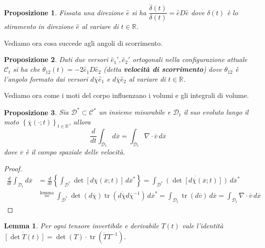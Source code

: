 \documentclass{book}
\theoremstyle{plain}
\theoremstyle{plain}
\newtheorem*{lemma}{Lemma}
\theoremstyle{plain}
\theoremstyle{plain}
\theoremstyle{plain}
\newtheorem{prop}{Proposizione}[chapter]
\theoremstyle{definition}
\theoremstyle{remark}
\theoremstyle{definition}
\begin{document}
\begin{prop}
    Fissata una direzione $\hat{e}$ si ha $\dfrac{\dot{\delta}(t)}{\delta(t)}=\hat{e}D\hat{e}$ dove ${\delta}(t)$ è lo stiramento in direzione $\hat{e}$ al variare di $t\in\mathbb{R}$.
\end{prop}

\noindent Vediamo ora cosa succede agli angoli di scorrimento.

\begin{prop}
    Dati due versori $\hat{e}_1', \hat{e}_2'$ ortogonali nella configurazione attuale $\mathcal{C}_t$ si ha che $\dot{\theta}_{12}(t)=-2\hat{e}_1D\hat{e}_2$ (detta \textbf{velocità di scorrimento}) dove $\theta_{12}$ è l'angolo formato dai versori $d\overline{\chi}\hat{e}_1$ e $d\overline{\chi}\hat{e}_2$ al variare di $t\in\mathbb{R}$.
\end{prop}

\noindent Vediamo ora come i moti del corpo influenzano i volumi e gli integrali di volume.

\begin{prop}
    Sia $\mathcal{D}^* \subset\mathcal{C}^*$ un insieme misurabile e $\mathcal{D}_t$ il suo evoluto lungo il moto $\left\{\overline{\chi}(\cdot;t)\right\}_{t \in \mathbb{R}}$, allora
    \begin{displaymath}
        \frac{d}{dt}\int_{\mathcal{D}_t}d\overline{x}=\int_{\mathcal{D}_t}\nabla\cdot\overline{v}\,d\overline{x}
    \end{displaymath}
    dove $\overline{v}$ è il campo spaziale delle velocità.
\end{prop}

\begin{proof}
    \[
    \begin{split}
        \frac{d}{dt}\int_{\mathcal{D}_t}d\overline{x}&=\frac{d}{dt}\left\{\int_{\mathcal{D}^*}\det [d\overline{\chi}(\overline{x};t)]\,d\overline{x}^*\right\}=\int_{\mathcal{D}^*}\Dot{\left(\det [d\overline{\chi}(\overline{x};t)]\right)}\,d\overline{x}^* \\
        &\overset{\text{lemma}}{=}\int_{\mathcal{D}^*}\det(d\overline{\chi})\operatorname{tr}(d\Dot{\overline{\chi}}d\overline{\chi}^{-1})\,d\overline{x}^*=\int_{\mathcal{D}_t}\operatorname{tr}(d\overline{v})\,d\overline{x}=\int_{\mathcal{D}_t}\nabla\cdot\overline{v}\,d\overline{x}
    \end{split}
    \]
\end{proof}

\begin{lemma}
    Per ogni  tensore invertibile e derivabile $T(t)$ vale l'identità $\dot{[\det T(t)]} = \det(T)\cdot \operatorname{tr}(\dot{T}T^{-1})$.
\end{lemma}
\end{document}
